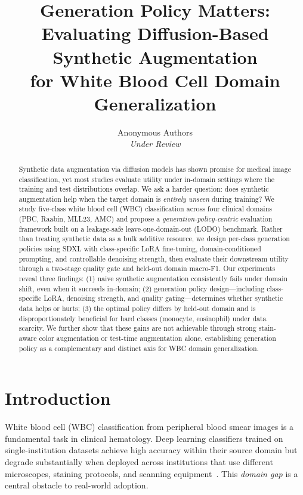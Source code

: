 \documentclass[10pt,twocolumn]{article}
\title{Generation Policy Matters: \\
Evaluating Diffusion-Based Synthetic Augmentation \\
for White Blood Cell Domain Generalization}
\author{%
  Anonymous Authors \\
  \textit{Under Review}
}
\date{}
\begin{document}
\maketitle

\begin{abstract}
Synthetic data augmentation via diffusion models has shown promise for
medical image classification, yet most studies evaluate utility under
in-domain settings where the training and test distributions overlap.
We ask a harder question: does synthetic augmentation help when the
target domain is \emph{entirely unseen} during training?
%
We study five-class white blood cell (WBC) classification across four
clinical domains (PBC, Raabin, MLL23, AMC) and propose a
\emph{generation-policy-centric} evaluation framework built on a
leakage-safe leave-one-domain-out (LODO) benchmark.
%
Rather than treating synthetic data as a bulk additive resource, we
design per-class generation policies using SDXL with class-specific LoRA
fine-tuning, domain-conditioned prompting, and controllable denoising
strength, then evaluate their downstream utility through a two-stage
quality gate and held-out domain macro-F1.
%
Our experiments reveal three findings: (1) naive synthetic augmentation
consistently fails under domain shift, even when it succeeds in-domain;
(2) generation policy design---including class-specific LoRA, denoising
strength, and quality gating---determines whether synthetic data helps or
hurts; (3) the optimal policy differs by held-out domain and is
disproportionately beneficial for hard classes (monocyte, eosinophil)
under data scarcity.
%
We further show that these gains are not achievable through strong
stain-aware color augmentation or test-time augmentation alone,
establishing generation policy as a complementary and distinct axis for
WBC domain generalization.
\end{abstract}

\section{Introduction}
\label{sec:intro}

White blood cell (WBC) classification from peripheral blood smear images
is a fundamental task in clinical hematology. Deep learning classifiers
trained on single-institution datasets achieve high accuracy within their
source domain but degrade substantially when deployed across institutions
that use different microscopes, staining protocols, and scanning
equipment~\citep{Tavakoli_2021}. This \emph{domain gap} is a central
obstacle to real-world adoption.
\end{document}

